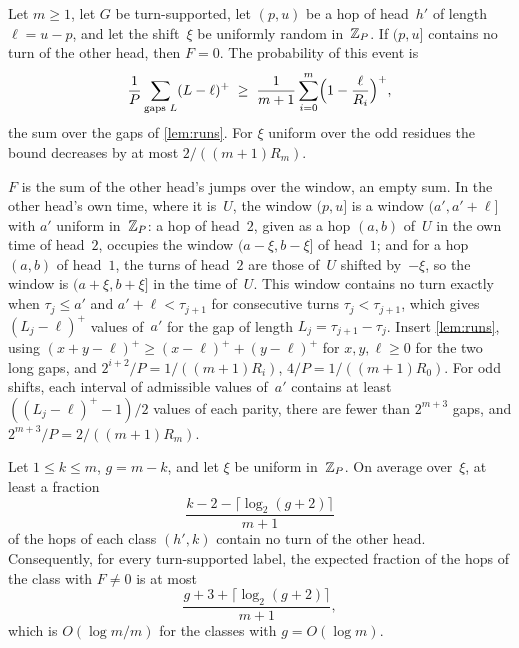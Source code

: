 \begin{proposition}[Blindness]\label{prop:blind}
\notformalized
Let $m\ge1$, let $G$ be turn-supported, let $(p,u)$ be a hop of head~$h'$ of length $\ell=u-p$, and let the shift~$\xi$ be uniformly
random in~$\mathbb{Z}_P$. If $(p,u]$ contains no turn of the other head, then $F=0$. The probability of this event is
\[
  \frac1P\sum_{\text{gaps }L}(L-\ell)^+\;\ge\;\frac1{m+1}\sum_{i=0}^m\Bigl(1-\frac\ell{R_i}\Bigr)^+,
\]
the sum over the gaps of \cref{lem:runs}. For $\xi$ uniform over the odd residues the bound decreases by at most
$2/((m+1)R_m)$.
\end{proposition}

\begin{informalproof}
$F$ is the sum of the other head's jumps over the window, an empty sum. In the other head's own time, where it is~$U$, the
window $(p,u]$ is a window $(a',a'+\ell]$ with $a'$ uniform in~$\mathbb{Z}_P$: a hop of head~$2$, given as a hop $(a,b)$ of~$U$ in the
own time of head~$2$, occupies the window $(a-\xi,b-\xi]$ of head~$1$; and for a hop $(a,b)$ of head~$1$, the turns of head~$2$
are those of~$U$ shifted by~$-\xi$, so the window is $(a+\xi,b+\xi]$ in the time of~$U$. This window contains no turn exactly when
$\tau_j\le a'$ and $a'+\ell<\tau_{j+1}$ for consecutive turns $\tau_j<\tau_{j+1}$, which gives $(L_j-\ell)^+$ values
of~$a'$ for the gap of length $L_j=\tau_{j+1}-\tau_j$. Insert \cref{lem:runs}, using
$(x+y-\ell)^+\ge(x-\ell)^++(y-\ell)^+$ for $x,y,\ell\ge0$ for the two long gaps, and $2^{i+2}/P=1/((m+1)R_i)$,
$4/P=1/((m+1)R_0)$. For odd shifts, each interval of admissible values of~$a'$ contains at least $((L_j-\ell)^+-1)/2$
values of each parity, there are fewer than $2^{m+3}$ gaps, and $2^{m+3}/P=2/((m+1)R_m)$.
\end{informalproof}

\begin{corollary}\label{cor:blind}
\notformalized
Let $1\le k\le m$, $g=m-k$, and let $\xi$ be uniform in~$\mathbb{Z}_P$. On average over~$\xi$, at least a fraction
\[
  \frac{k-2-\lceil\log_2(g+2)\rceil}{m+1}
\]
of the hops of each class $(h',k)$ contain no turn of the other head. Consequently, for every turn-supported label, the
expected fraction of the hops of the class with $F\ne0$ is at most
\[
  \frac{g+3+\lceil\log_2(g+2)\rceil}{m+1},
\]
which is $O(\log m/m)$ for the classes with $g=O(\log m)$.
\end{corollary}

